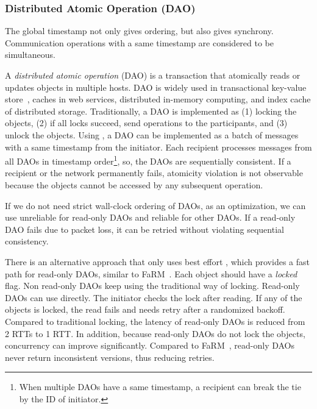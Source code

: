 \subsubsection{Distributed Atomic Operation (DAO)}
\label{subsec:dao}

The global timestamp not only gives ordering, but also gives synchrony. Communication operations with a same timestamp are considered to be simultaneous.

A \emph{distributed atomic operation} (DAO) is a transaction that atomically reads or updates objects in multiple hosts.
DAO is widely used in transactional key-value store~\cite{dey2014ycsbt}, caches in web services, distributed in-memory computing, and index cache of distributed storage.
Traditionally, a DAO is implemented as (1) locking the objects, (2) if all locks succeed, send operations to the participants, and (3) unlock the objects.
Using \sys{}, a DAO can be implemented as a batch of messages with a same timestamp from the initiator.
Each recipient processes messages from all DAOs in timestamp order\footnote{When multiple DAOs have a same timestamp, a recipient can break the tie by the ID of initiator.}, so, the DAOs are sequentially consistent.
If a recipient or the network permanently fails, atomicity violation is not observable because the objects cannot be accessed by any subsequent operation.


If we do not need strict wall-clock ordering of DAOs, as an optimization, we can use unreliable \sys{} for read-only DAOs and reliable \sys{} for other DAOs. If a read-only DAO fails due to packet loss, it can be retried without violating sequential consistency.

There is an alternative approach that only uses best effort \sys{}, which provides a fast path for read-only DAOs, similar to FaRM~\cite{dragojevic2014farm}. Each object should have a \emph{locked} flag. Non read-only DAOs keep using the traditional way of locking. Read-only DAOs can use \sys{} directly. The initiator checks the lock after reading. If any of the objects is locked, the read fails and needs retry after a randomized backoff. Compared to traditional locking, the latency of read-only DAOs is reduced from 2 RTTs to 1 RTT. In addition, because read-only DAOs do not lock the objects, concurrency can improve significantly. Compared to FaRM~\cite{dragojevic2014farm}, \sys{} read-only DAOs never return inconsistent versions, thus reducing retries.

